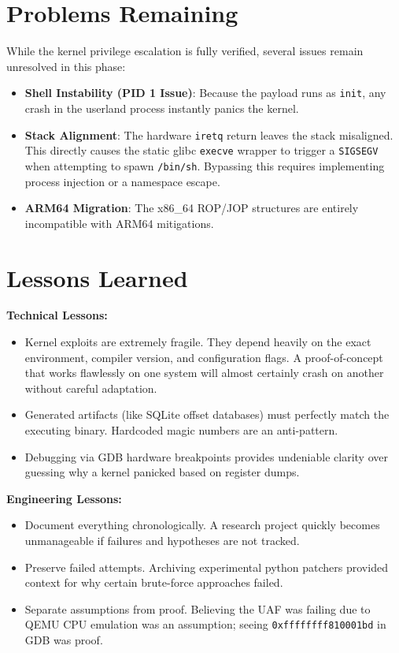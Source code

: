 \documentclass[11pt,a4paper]{article}
\begin{document}
\section{Problems Remaining}
While the kernel privilege escalation is fully verified, several issues remain unresolved in this phase:
\begin{itemize}
    \item \textbf{Shell Instability (PID 1 Issue)}: Because the payload runs as \texttt{init}, any crash in the userland process instantly panics the kernel.
    \item \textbf{Stack Alignment}: The hardware \texttt{iretq} return leaves the stack misaligned. This directly causes the static glibc \texttt{execve} wrapper to trigger a \texttt{SIGSEGV} when attempting to spawn \texttt{/bin/sh}. Bypassing this requires implementing process injection or a namespace escape.
    \item \textbf{ARM64 Migration}: The x86\_64 ROP/JOP structures are entirely incompatible with ARM64 mitigations.
\end{itemize}

\clearpage

\section{Lessons Learned}
\textbf{Technical Lessons:}
\begin{itemize}
    \item Kernel exploits are extremely fragile. They depend heavily on the exact environment, compiler version, and configuration flags. A proof-of-concept that works flawlessly on one system will almost certainly crash on another without careful adaptation.
    \item Generated artifacts (like SQLite offset databases) must perfectly match the executing binary. Hardcoded magic numbers are an anti-pattern.
    \item Debugging via GDB hardware breakpoints provides undeniable clarity over guessing why a kernel panicked based on register dumps.
\end{itemize}

\textbf{Engineering Lessons:}
\begin{itemize}
    \item Document everything chronologically. A research project quickly becomes unmanageable if failures and hypotheses are not tracked.
    \item Preserve failed attempts. Archiving experimental python patchers provided context for why certain brute-force approaches failed.
    \item Separate assumptions from proof. Believing the UAF was failing due to QEMU CPU emulation was an assumption; seeing \texttt{0xffffffff810001bd} in GDB was proof.
\end{itemize}
\end{document}
